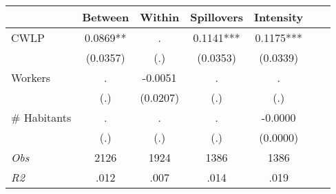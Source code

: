 \begin{tabular}{l*{6}{c}}\hline&\multicolumn{1}{c}{Between}&\multicolumn{1}{c}{Within}&\multicolumn{1}{c}{Spillovers}&\multicolumn{1}{c}{Intensity}\\ \hline 
CWLP & 0.0869** & . & 0.1141*** & 0.1175*** \\
 & (0.0357) & (.) & (0.0353) & (0.0339) \\
Workers & . & -0.0051 & . & . \\
 & (.) & (0.0207) & (.) & (.) \\
\# Habitants & . & . & . & -0.0000 \\
  & (.) & (.) & (.) & (0.0000) \\
\hline \textit{Obs} & 2126 & 1924 & 1386 & 1386  \\ \textit{R2} & .012 & .007 & .014 & .019 \\ \hline \end{tabular}

